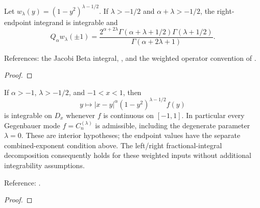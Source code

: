 \begin{supporting}
\begin{theorem}
\label{thm:power-law-gegenbauer-endpoints}
\leanok
Let $w_\lambda(y)=(1-y^2)^{\lambda-1/2}$. If $\lambda>-1/2$ and
$\alpha+\lambda>-1/2$, the right-endpoint integrand is integrable and
\[
 Q_\alpha w_\lambda(\pm1)=
 \frac{2^{\alpha+2\lambda}\Gamma(\alpha+\lambda+1/2)
       \Gamma(\lambda+1/2)}{\Gamma(\alpha+2\lambda+1)}.
\]


References: the Jacobi Beta integral, \cite[5.12.1]{dlmf}, and the weighted operator
convention of \cite[Section 2]{gutleb-carrillo-olver}.
\end{theorem}
\begin{proof}
\leanok
\end{proof}



\begin{theorem}
\label{thm:power-law-weighted-interior}
\leanok
If $\alpha>-1$, $\lambda>-1/2$, and $-1<x<1$, then
\[
 y\longmapsto |x-y|^\alpha (1-y^2)^{\lambda-1/2}f(y)
\]
is integrable on $D_x$ whenever $f$ is continuous on $[-1,1]$.
In particular every Gegenbauer mode $f=C_n^{(\lambda)}$ is admissible, including
the degenerate parameter $\lambda=0$. These are interior hypotheses; the
endpoint values have the separate combined-exponent condition above.
The left/right fractional-integral decomposition consequently holds for these
weighted inputs without additional integrability assumptions.

Reference: \cite[Section 2]{gutleb-carrillo-olver}.
\end{theorem}
\begin{proof}
\leanok
\end{proof}


\end{supporting}
